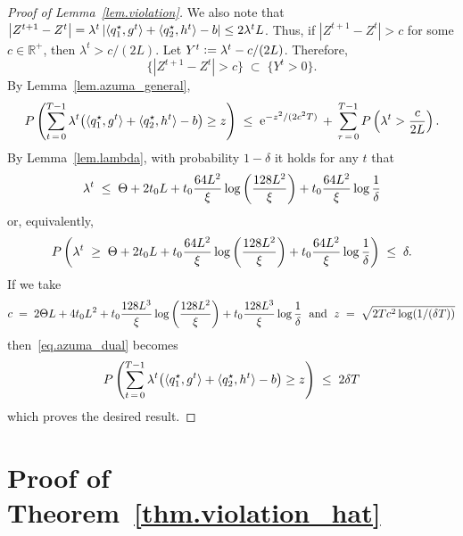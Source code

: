 \documentclass[12pt, final]{l4dc2023}
\begin{document}
\begin{proof}[Proof of Lemma~\ref{lem.violation}]
	We also note that
	$\left|Z^{t+1}-Z^{t}\right| 
	= \lambda^{t} \left|\langle{ q_1^\star},{g^{t}}\rangle 
		+ \langle{ q_2^\star},{h^{t}}\rangle -b\right|
	\leq 2\lambda^{t} L$.
	Thus, if $|Z^{t+1}-Z^t|> c$ for some $c\in\mathbb{R}^+$, then $\lambda^t> c/(2L)$. Let $Y^t \mathrel{\mathop:}= \lambda^t - c/(2L)$. Therefore,
	\[
	\{ |Z^{t+1}-Z^t|> c \}  \;\subset\;  \{ Y^t > 0 \}.
	\]
	By Lemma~\ref{lem.azuma_general},
	\begin{equation}\label{eq.azuma_dual}
	P \left( \sum_{t\,=\,0}^{T-1}
		\lambda^{t} \big(\langle{ q_1^\star},{g^{t}}\rangle 
		+ \langle{ q_2^\star},{h^{t}}\rangle -b\big)\geq z \right) \;\leq\; {\rm e}^{-z^2/ (2c^2T)} \,+\, \sum_{\tau\,=\,0}^{T-1} P \left(\lambda^t>\frac{c}{2L}\right).
	\end{equation}
	By Lemma~\ref{lem.lambda}, with probability $1-\delta$ it holds for any $t$ that
	\[
	\lambda^t \; \leq\; \displaystyle \Theta + 2 t_0L+ t_0 \frac{64 L^2}{\xi} \log \left(\frac{128 L^2}{\xi}\right) + t_0 \frac{64 L^2}{\xi} \log\frac{1}{\delta}
	\]
	or, equivalently,
	\[
	P \left(
		\lambda^t \;\geq\; \displaystyle \Theta + 2 t_0L+ t_0 \frac{64 L^2}{\xi} \log \left(\frac{128 L^2}{\xi}\right) + t_0 \frac{64 L^2}{\xi} \log\frac{1}{\delta}
	\right) \;\leq\; \delta.
	\]
	If we take 
	\[
	c\;=\;  2\Theta L + 4 t_0 L^2+ t_0 \frac{128 L^3}{\xi} \log \left(\frac{128 L^2}{\xi}\right) + t_0 \frac{128 L^3}{\xi} \log\frac{1}{\delta}
	\;\text{ and }\;
	z\;=\;\sqrt{2T c^2 \log (1/(\delta T))}
	\]
	then~\eqref{eq.azuma_dual} becomes
	\[
	P \left( \sum_{t\,=\,0}^{T-1}
		\lambda^{t} \big(\langle{ q_1^\star},{g^{t}}\rangle 
		+ \langle{ q_2^\star},{h^{t}}\rangle -b\big)\geq z \right) \;\leq\; 2\delta  T
	\]
	which proves the desired result.
\end{proof}

\section{Proof of Theorem~\ref{thm.violation_hat}}
\label{ap.violation_hat}
\end{document}
